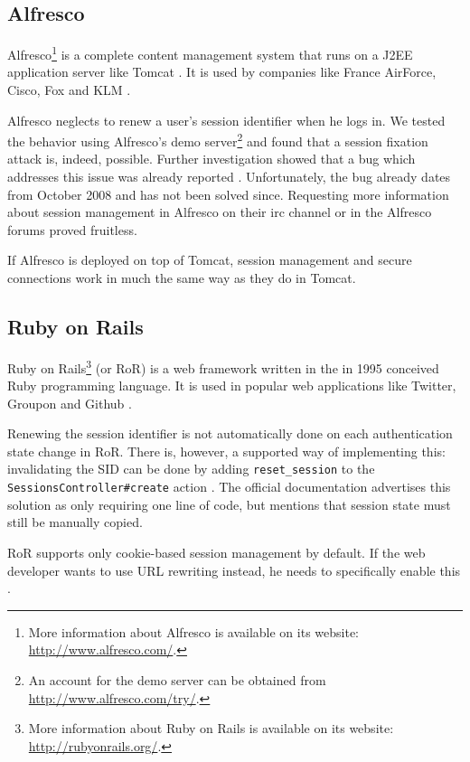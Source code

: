 \subsection{Alfresco}

Alfresco\footnote{More information about Alfresco is available on its website: \url{http://www.alfresco.com/}.} is a complete content management system that runs on a J2EE application server like Tomcat \cite{TomcatPoweredBy}. It is used by companies like France AirForce, Cisco, Fox and KLM \cite{AlfrescoPoweredBy}.

Alfresco neglects to renew a user's session identifier when he logs in. We tested the behavior using Alfresco's demo server\footnote{An account for the demo server can be obtained from \url{http://www.alfresco.com/try/}.} and found that a session fixation attack is, indeed, possible. Further investigation showed that a bug which addresses this issue was already reported \cite{AlfrescoSessionFixation}. Unfortunately, the bug already dates from October 2008 and has not been solved since. Requesting more information about session management in Alfresco on their \gls{irc} channel or in the Alfresco forums proved fruitless.

If Alfresco is deployed on top of Tomcat, session management and secure connections work in much the same way as they do in Tomcat.

\subsection{Ruby on Rails}

Ruby on Rails\footnote{More information about Ruby on Rails is available on its website: \url{http://rubyonrails.org/}.} (or RoR) is a web framework written in the in 1995 conceived Ruby programming language. It is used in popular web applications like Twitter, Groupon and Github \cite{RailsApps}.

Renewing the session identifier is not automatically done on each authentication state change in RoR. There is, however, a supported way of implementing this: invalidating the SID can be done by adding \texttt{reset\_session} to the \texttt{SessionsController\#create} action \cite{Webers2008}. The official documentation advertises this solution as only requiring one line of code, but mentions that session state must still be manually copied.

RoR supports only cookie-based session management by default. If the web developer wants to use URL rewriting instead, he needs to specifically enable this \cite{McMahon2010}.

